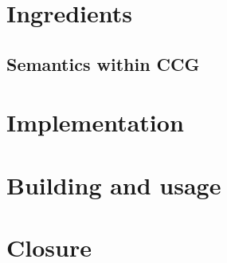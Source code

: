 


    
    

\pagebreak
\section{Ingredients}
    
    
    \subsection{Semantics within CCG}
        
        
        
    
    
\pagebreak
\section{Implementation}
    
    
    
    
    
\pagebreak
\section{Building and usage}
    
\pagebreak
\section{Closure}
    

\pagebreak
\begin{appendices} \appendix
    
    
    
\end{appendices}

\pagebreak
\printbibliography[heading=bibintoc,title={References}]
